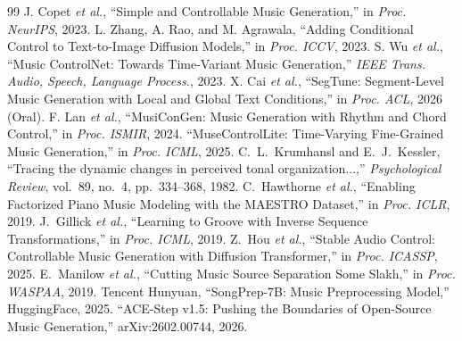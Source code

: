 \documentclass[11pt,twocolumn]{article}
\begin{document}
\begin{thebibliography}{99}
 J. Copet \textit{et al.}, ``Simple and Controllable Music Generation,'' in \textit{Proc. NeurIPS}, 2023.
 L. Zhang, A. Rao, and M. Agrawala, ``Adding Conditional Control to Text-to-Image Diffusion Models,'' in \textit{Proc. ICCV}, 2023.
 S. Wu \textit{et al.}, ``Music ControlNet: Towards Time-Variant Music Generation,'' \textit{IEEE Trans. Audio, Speech, Language Process.}, 2023.
 X. Cai \textit{et al.}, ``SegTune: Segment-Level Music Generation with Local and Global Text Conditions,'' in \textit{Proc. ACL}, 2026 (Oral).
 F. Lan \textit{et al.}, ``MusiConGen: Music Generation with Rhythm and Chord Control,'' in \textit{Proc. ISMIR}, 2024.
 ``MuseControlLite: Time-Varying Fine-Grained Music Generation,'' in \textit{Proc. ICML}, 2025.
 C.~L.~Krumhansl and E.~J.~Kessler, ``Tracing the dynamic changes in perceived tonal organization...,'' \textit{Psychological Review}, vol.~89, no.~4, pp.~334--368, 1982.
 C.~Hawthorne \textit{et al.}, ``Enabling Factorized Piano Music Modeling with the MAESTRO Dataset,'' in \textit{Proc. ICLR}, 2019.
 J.~Gillick \textit{et al.}, ``Learning to Groove with Inverse Sequence Transformations,'' in \textit{Proc. ICML}, 2019.
 Z.~Hou \textit{et al.}, ``Stable Audio Control: Controllable Music Generation with Diffusion Transformer,'' in \textit{Proc. ICASSP}, 2025.
 E.~Manilow \textit{et al.}, ``Cutting Music Source Separation Some Slakh,'' in \textit{Proc. WASPAA}, 2019.
 Tencent Hunyuan, ``SongPrep-7B: Music Preprocessing Model,'' HuggingFace, 2025.
 ``ACE-Step v1.5: Pushing the Boundaries of Open-Source Music Generation,'' arXiv:2602.00744, 2026.
\end{thebibliography}
\end{document}
